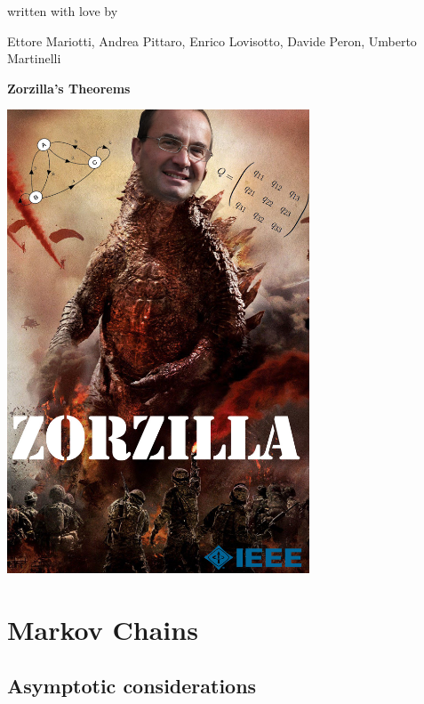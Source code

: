 \documentclass[a4paper,12pt]{report}
\begin{document}

\begin{titlepage}
\centering
{}
{written with love by\par}
{\Large Ettore Mariotti, Andrea Pittaro, Enrico Lovisotto, Davide Peron, Umberto Martinelli\par}
\vspace{1cm}
{\LARGE{ \bfseries Zorzilla's Theorems \par}}
\vspace{2cm}
\includegraphics[width=9cm]{Zorzilla}
\end{titlepage}

\chapter{Markov Chains}


\section{Asymptotic considerations}
\end{document}
